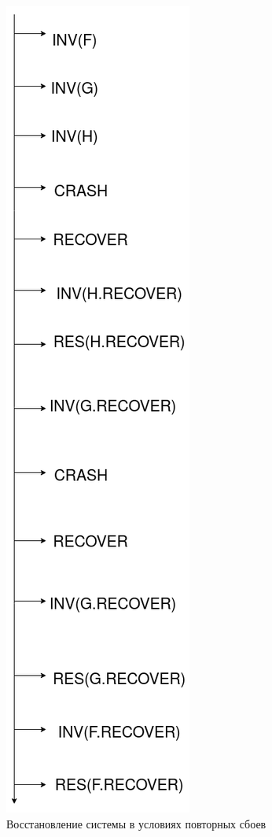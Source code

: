 \documentclass[times,specification,annotation]{itmo-student-thesis}
\begin{document}
\begin{figure}[H]
  \centering
  \caption{Восстановление системы в условиях повторных сбоев}
  \label{repeatable-crash-pic}
  \includegraphics[scale=0.5]{repeatable_crash.png}
\end{figure}
\end{document}
